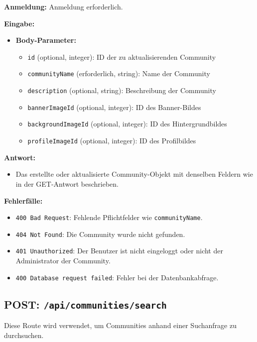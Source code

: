 \documentclass[a4paper,12pt]{article}
\begin{document}
\textbf{Anmeldung:} Anmeldung erforderlich.

\textbf{Eingabe:}
\begin{itemize}
    \item \textbf{Body-Parameter:}
    \begin{itemize}
        \item \texttt{id} (optional, integer):
            ID der zu aktualisierenden Community
        \item \texttt{communityName} (erforderlich, string):
            Name der Community
        \item \texttt{description} (optional, string):
            Beschreibung der Community
        \item \texttt{bannerImageId} (optional, integer):
            ID des Banner-Bildes
        \item \texttt{backgroundImageId} (optional, integer):
            ID des Hintergrundbildes
        \item \texttt{profileImageId} (optional, integer):
            ID des Profilbildes
    \end{itemize}
\end{itemize}

\textbf{Antwort:}
\begin{itemize}
    \item Das erstellte oder aktualisierte Community-Objekt mit denselben
    Feldern wie in der GET-Antwort beschrieben.
\end{itemize}

\textbf{Fehlerfälle:}
\begin{itemize}
    \item \texttt{400 Bad Request}:
        Fehlende Pflichtfelder wie \texttt{communityName}.
    \item \texttt{404 Not Found}:
        Die Community wurde nicht gefunden.
    \item \texttt{401 Unauthorized}:
        Der Benutzer ist nicht eingeloggt oder nicht der Administrator der
        Community.
    \item \texttt{400 Database request failed}:
        Fehler bei der Datenbankabfrage.
\end{itemize}

\newpage
\subsection{POST: \texttt{/api/communities/search}}

Diese Route wird verwendet, um Communities anhand einer Suchanfrage zu
durchsuchen.
\end{document}
